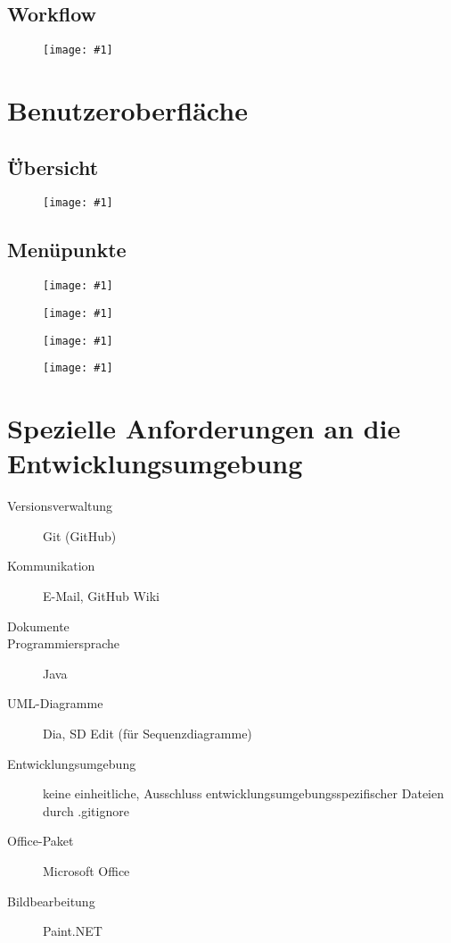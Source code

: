 \documentclass[a4paper,10pt]{article}
\newlength{\imgwidth}
\newcommand\scalegraphics[1]{
  \settowidth{\imgwidth}{\texttt{[image: \#1]}}
  \setlength{\imgwidth}{\minof{\imgwidth}{\textwidth}}
  \texttt{[image: \#1]}
}
\begin{document}
\subsection{Workflow}
\begin{figure}[h!]
\scalegraphics{images/process.png}
\end{figure}


\section{Benutzeroberfl\"{a}che}
\subsection{\"{Ü}bersicht}
\begin{figure}[h!]
\scalegraphics{images/mockupf.png}
\end{figure}

\subsection{Men\"{u}punkte}
\begin{figure}[h!]
\scalegraphics{images/menu1.png}
\end{figure}
\begin{figure}[h!]
\scalegraphics{images/menu2.png}
\end{figure}
\begin{figure}[h!]
\scalegraphics{images/menu3.png}
\end{figure}
\begin{figure}[h!]
\scalegraphics{images/menu4.png}
\end{figure}

\section{Spezielle Anforderungen an die Entwicklungsumgebung}
\begin{description}
  \item[Versionsverwaltung] Git (GitHub)
  \item[Kommunikation] E-Mail, GitHub Wiki
  \item[Dokumente] \LaTeXe
  \item[Programmiersprache] Java
  \item[UML-Diagramme] Dia, SD Edit (f\"{u}r Sequenzdiagramme)
  \item[Entwicklungsumgebung] keine einheitliche, Ausschluss entwicklungsumgebungsspezifischer Dateien durch .gitignore
  \item[Office-Paket] Microsoft Office
  \item[Bildbearbeitung] Paint.NET
\end{description}
\end{document}

